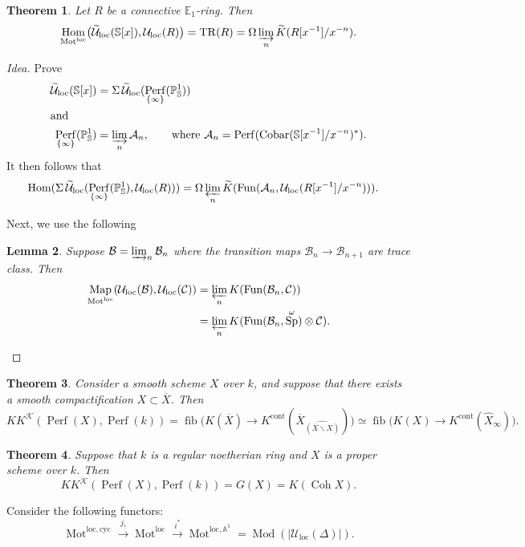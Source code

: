 \documentclass[draft]{amsart}
\newcommand{\EE}{\mathbb{E}}
\renewcommand{\AA}{\mathbb{A}}
\renewcommand{\SS}{\mathbb{S}}
\newcommand{\PP}{\mathbb{P}}
\newcommand{\ol}[1]{\overline{#1}}
\newcommand{\wh}[1]{\widehat{#1}}
\newcommand{\wt}[1]{\widetilde{#1}}
\newcommand{\cat}[1]{\mathcal{#1}}
\renewcommand{\setminus}{\smallsetminus}
\DeclareMathOperator{\Hom}{Hom}
\DeclareMathOperator{\fib}{fib}
\DeclareMathOperator{\Coh}{Coh}
\DeclareMathOperator{\Map}{Map}
\DeclareMathOperator{\Sp}{Sp}
\DeclareMathOperator{\Fun}{Fun}
\DeclareMathOperator{\Mod}{Mod}
\DeclareMathOperator{\Perf}{Perf}
\DeclareMathOperator{\TR}{TR}
\DeclareMathOperator{\Cobar}{Cobar}
\DeclareMathOperator{\Mot}{Mot}
\newtheorem{thm}{Theorem}[section]
\newtheorem{lem}[thm]{Lemma}
\theoremstyle{definition}
\begin{document}
\begin{thm}
Let $R$ be a connective $\EE_1$-ring. Then 
\[
\Hom_{\Mot^{\mathrm{loc}}}\bigl(\wt{\cat U}_{\mathrm{loc}}(\SS[x]), \cat U_{\mathrm{loc}}(R)\bigr) = \TR(R) = \Omega \varinjlim_n \wt{K}(R[x^{-1}]/x^{-n}).
\]
\end{thm}
\begin{proof}[Idea]
Prove
\begin{align*}
\wt{\cat U}_{\mathrm{loc}}(\SS[x]) &= \Sigma\, \wt{\cat U}_{\mathrm{loc}}(\Perf_{\{\infty\}}(\PP^1_{\SS})) \\
\intertext{and}
\Perf_{\{\infty\}}(\PP^1_{\SS}) &= \varinjlim_n \cat A_n,\qquad \text{where $\cat A_n = \Perf(\Cobar(\SS[x^{-1}]/x^{-n})^*)$.}
\end{align*}
It then follows that
\begin{align*}
\Hom(\Sigma\, \wt{\cat U}_{\mathrm{loc}}(\Perf_{\{\infty\}}(\PP^1_{\SS}), \cat U_{\mathrm{loc}}(R))) &= \Omega \varprojlim_n \wt{K}(\Fun(\cat A_n, \cat U_{\mathrm{loc}}(R[x^{-1}]/x^{-n}))).
\end{align*}

Next, we use the following
\begin{lem}
Suppose $\cat B= \varinjlim_n \cat B_n$ where the transition maps $\cat B_n\to \cat B_{n+1}$ are trace class. Then 
\begin{align*}
\Map_{\Mot^{\mathrm{loc}}}(\cat U_{\mathrm{loc}}(\cat B), \cat U_{\mathrm{loc}}(\cat C)) &= \varprojlim_n K(\Fun(\cat B_n, \cat C)) \\
&= \varprojlim_n K(\Fun(\cat B_n, \Sp^{\omega})\otimes \cat C).
\end{align*}
\end{lem}
\end{proof}

\begin{thm} 
Consider a smooth scheme $X$ over $k$, and suppose that there exists a smooth compactification $X\subset \ol{X}$. Then
\[
\mathit{KK}^{\cat K}(\Perf(X), \Perf(k)) = \fib\bigl(K(\ol{X}) \to K^{\mathrm{cont}}(\ol{X}_{\wh{(\ol X\setminus X)}})\bigr)
\simeq \fib\bigl( K(X) \to K^{\mathrm{cont}}(\wh{X}_{\infty})\bigr).
\]
\end{thm}

\begin{thm}
Suppose that $k$ is a regular noetherian ring and $X$ is a proper scheme over $k$. Then
\[
\mathit{KK}^{\cat K}(\Perf(X), \Perf(k)) = G(X) = K(\Coh X).
\]
\end{thm}

Consider the following functors:
\[
\Mot^{\mathrm{loc, cyc}} \xrightarrow{j_!} \Mot^{\mathrm{loc}} \xrightarrow{i^*} \Mot^{\mathrm{loc}, \AA^1} = \Mod(\lvert\cat U_{\mathrm{loc}}(\Delta)\rvert).
\]
\end{document}
